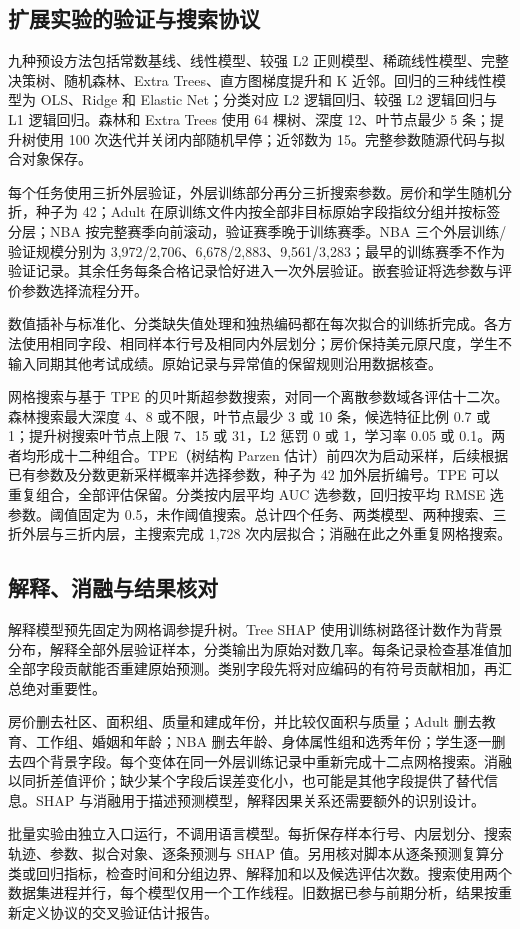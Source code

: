 \subsection{扩展实验的验证与搜索协议}\label{sec:new-protocol}
九种预设方法包括常数基线、线性模型、较强 L2 正则模型、稀疏线性模型、完整决策树、随机森林、Extra Trees、直方图梯度提升和 K 近邻。回归的三种线性模型为 OLS、Ridge 和 Elastic Net；分类对应 L2 逻辑回归、较强 L2 逻辑回归与 L1 逻辑回归。森林和 Extra Trees 使用 64 棵树、深度 12、叶节点最少 5 条；提升树使用 100 次迭代并关闭内部随机早停；近邻数为 15。完整参数随源代码与拟合对象保存。

每个任务使用三折外层验证，外层训练部分再分三折搜索参数。房价和学生随机分折，种子为 42；Adult 在原训练文件内按全部非目标原始字段指纹分组并按标签分层；NBA 按完整赛季向前滚动，验证赛季晚于训练赛季。NBA 三个外层训练/验证规模分别为 3,972/2,706、6,678/2,883、9,561/3,283；最早的训练赛季不作为验证记录。其余任务每条合格记录恰好进入一次外层验证。嵌套验证将选参数与评价参数选择流程分开\citep{nestedcv}。

数值插补与标准化、分类缺失值处理和独热编码都在每次拟合的训练折完成。各方法使用相同字段、相同样本行号及相同内外层划分；房价保持美元原尺度，学生不输入同期其他考试成绩。原始记录与异常值的保留规则沿用数据核查。

网格搜索与基于 TPE 的贝叶斯超参数搜索，对同一个离散参数域各评估十二次。森林搜索最大深度 4、8 或不限，叶节点最少 3 或 10 条，候选特征比例 0.7 或 1；提升树搜索叶节点上限 7、15 或 31，L2 惩罚 0 或 1，学习率 0.05 或 0.1。两者均形成十二种组合。TPE（树结构 Parzen 估计）前四次为启动采样，后续根据已有参数及分数更新采样概率并选择参数，种子为 42 加外层折编号\citep{optunadocs}。TPE 可以重复组合，全部评估保留。分类按内层平均 AUC 选参数，回归按平均 RMSE 选参数。阈值固定为 0.5，未作阈值搜索。总计四个任务、两类模型、两种搜索、三折外层与三折内层，主搜索完成 1,728 次内层拟合；消融在此之外重复网格搜索。

\subsection{解释、消融与结果核对}
解释模型预先固定为网格调参提升树。Tree SHAP 使用训练树路径计数作为背景分布，解释全部外层验证样本，分类输出为原始对数几率\citep{shapdocs}。每条记录检查基准值加全部字段贡献能否重建原始预测。类别字段先将对应编码的有符号贡献相加，再汇总绝对重要性。

房价删去社区、面积组、质量和建成年份，并比较仅面积与质量；Adult 删去教育、工作组、婚姻和年龄；NBA 删去年龄、身体属性组和选秀年份；学生逐一删去四个背景字段。每个变体在同一外层训练记录中重新完成十二点网格搜索。消融以同折差值评价；缺少某个字段后误差变化小，也可能是其他字段提供了替代信息。SHAP 与消融用于描述预测模型，解释因果关系还需要额外的识别设计。

批量实验由独立入口运行，不调用语言模型。每折保存样本行号、内层划分、搜索轨迹、参数、拟合对象、逐条预测与 SHAP 值。另用核对脚本从逐条预测复算分类或回归指标，检查时间和分组边界、解释加和以及候选评估次数。搜索使用两个数据集进程并行，每个模型仅用一个工作线程。旧数据已参与前期分析，结果按重新定义协议的交叉验证估计报告。

